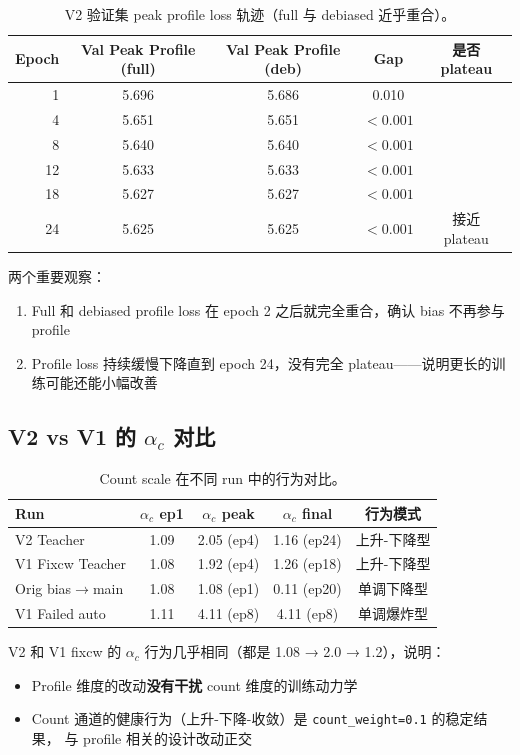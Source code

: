 \documentclass[11pt,a4paper]{ctexart}
\begin{document}
\begin{table}[H]
\centering
\small
\caption{V2 验证集 peak profile loss 轨迹（full 与 debiased 近乎重合）。}
\begin{tabular}{rcccc}
\toprule
Epoch & Val Peak Profile (full) & Val Peak Profile (deb) & Gap & 是否 plateau \\
\midrule
1 & 5.696 & 5.686 & 0.010 & \\
4 & 5.651 & 5.651 & $< 0.001$ & \\
8 & 5.640 & 5.640 & $< 0.001$ & \\
12 & 5.633 & 5.633 & $< 0.001$ & \\
18 & 5.627 & 5.627 & $< 0.001$ & \\
24 & 5.625 & 5.625 & $< 0.001$ & 接近 plateau \\
\bottomrule
\end{tabular}
\end{table}

两个重要观察：
\begin{enumerate}[leftmargin=2em]
  \item Full 和 debiased profile loss 在 epoch 2 之后就完全重合，确认 bias 不再参与 profile
  \item Profile loss 持续缓慢下降直到 epoch 24，没有完全 plateau——说明更长的训练可能还能小幅改善
\end{enumerate}

\subsection{V2 vs V1 的 $\alpha_c$ 对比}

\begin{table}[H]
\centering
\small
\caption{Count scale 在不同 run 中的行为对比。}
\begin{tabular}{lcccc}
\toprule
Run & $\alpha_c$ ep1 & $\alpha_c$ peak & $\alpha_c$ final & 行为模式 \\
\midrule
V2 Teacher & 1.09 & 2.05 (ep4) & 1.16 (ep24) & 上升-下降型 \\
V1 Fixcw Teacher & 1.08 & 1.92 (ep4) & 1.26 (ep18) & 上升-下降型 \\
Orig bias$\to$main & 1.08 & 1.08 (ep1) & 0.11 (ep20) & 单调下降型 \\
V1 Failed auto & 1.11 & 4.11 (ep8) & 4.11 (ep8) & 单调爆炸型 \\
\bottomrule
\end{tabular}
\end{table}

V2 和 V1 fixcw 的 $\alpha_c$ 行为几乎相同（都是 1.08 → 2.0 → 1.2），说明：
\begin{itemize}[leftmargin=2em]
  \item Profile 维度的改动\textbf{没有干扰} count 维度的训练动力学
  \item Count 通道的健康行为（上升-下降-收敛）是 \texttt{count\_weight=0.1} 的稳定结果，
  与 profile 相关的设计改动正交
\end{itemize}
\end{document}
